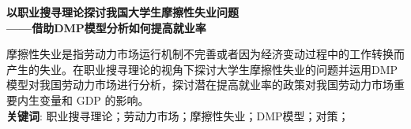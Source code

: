 \documentclass[12pt,openany,oneside]{ctexart}       %
\begin{document}



\setcounter{page}{1}                                 %



\pagestyle{plain}

\fontsize{12pt}{18pt}\selectfont
\begin{center} 
	{\fontsize{15.75pt}{13pt}\selectfont\bf 以职业搜寻理论探讨我国大学生摩擦性失业问题\\ {\kaishu ——借助DMP模型分析如何提高就业率}  }
\end{center}

\begin{center}
{\fontsize{15.75pt}{13pt}\selectfont{\bf 摘~要}} \vspace{1.0cm}
\end{center}

摩擦性失业是指劳动力市场运行机制不完善或者因为经济变动过程中的工作转换而产生的失业。在职业搜寻理论的视角下探讨大学生摩擦性失业的问题并运用DMP模型对我国劳动力市场进行分析，探讨潜在提高就业率的政策对我国劳动力市场重要内生变量和 GDP 的影响。\\
\textbf{\hei 关键词}: 职业搜寻理论；劳动力市场；摩擦性失业；DMP模型；对策；

\newpage

\end{document}
